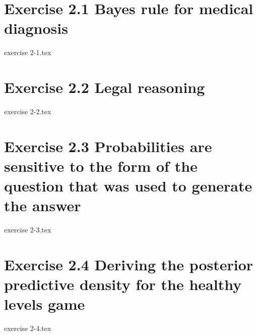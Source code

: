 \section*{Exercise 2.1 Bayes rule for medical diagnosis}
{exercise 2-1.tex}
\newpage
{}
\section*{Exercise 2.2 Legal reasoning}
{exercise 2-2.tex}
\newpage
{}
\section*{Exercise 2.3 Probabilities are sensitive to the form of the question that was used to generate the answer}
{exercise 2-3.tex}
\newpage
{}
\section*{Exercise 2.4 Deriving the posterior predictive density for the healthy levels game}
{exercise 2-4.tex}
